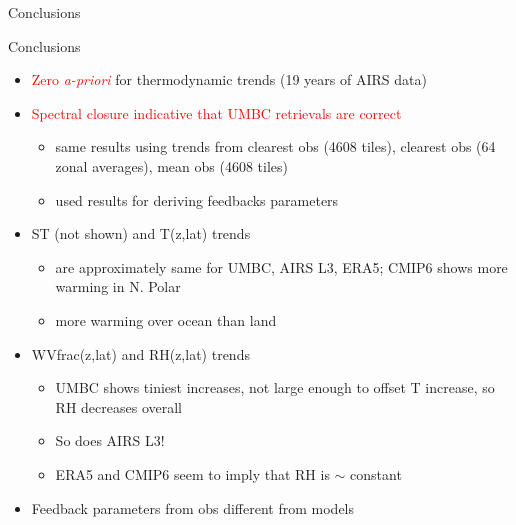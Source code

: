 \documentclass[10pt,t]{beamer}
\begin{document}
\begin{frame}{Conclusions}

\begin{block}{Conclusions}
\begin{itemize}

\item \textcolor{red}{Zero \emph{a-priori}} for thermodynamic trends (19 years of AIRS data)

\item \textcolor{red}{Spectral closure indicative that UMBC retrievals are correct}
\begin{itemize}
\item same results using trends from clearest obs (4608 tiles), clearest obs (64 zonal averages), mean obs (4608 tiles)
\item used results for deriving feedbacks parameters
\end{itemize}

\item ST (not shown) and T(z,lat) trends 
\begin{itemize}
\item are approximately same for UMBC, AIRS L3, ERA5; CMIP6 shows more warming in N. Polar
\item more warming over ocean than land
\end{itemize}

\item WVfrac(z,lat) and RH(z,lat) trends 
\begin{itemize}
\item UMBC shows tiniest increases, not large enough to offset T increase, so RH decreases overall
\item So does AIRS L3!
\item ERA5 and CMIP6 seem to imply that RH is $\sim$ constant
\end{itemize}

\item Feedback parameters from obs different from models
\end{itemize}
\end{block}

\end{frame}
\end{document}
